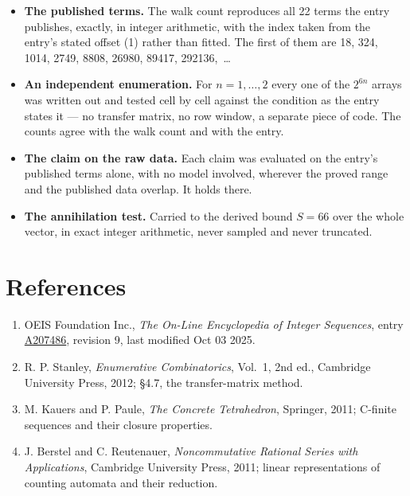 \documentclass[11pt]{article}
\theoremstyle{definition}
\begin{document}
\begin{itemize}

\item {\bfseries The published terms.} The walk count reproduces all 22 terms the entry publishes, exactly, in integer arithmetic, with the index taken from the entry's stated offset (1) rather than fitted. The first of them are 18, 324, 1014, 2749, 8808, 26980, 89417, 292136,~\dots

\item {\bfseries An independent enumeration.} For $n = 1,\dots,2$ every one of the $2^{6n}$ arrays was written out and tested cell by cell against the condition as the entry states it --- no transfer matrix, no row window, a separate piece of code. The counts agree with the walk count and with the entry.

\item {\bfseries The claim on the raw data.} Each claim was evaluated on the entry's published terms alone, with no model involved, wherever the proved range and the published data overlap. It holds there.

\item {\bfseries The annihilation test.} Carried to the derived bound $S = 66$ over the whole vector, in exact integer arithmetic, never sampled and never truncated.

\end{itemize}

\section{References}

\begin{enumerate}

\item OEIS Foundation Inc., \emph{The On-Line Encyclopedia of Integer Sequences}, entry \href{https://oeis.org/A207486}{A207486}, revision 9, last modified Oct 03 2025.

\item R. P. Stanley, \emph{Enumerative Combinatorics}, Vol.~1, 2nd ed., Cambridge University Press, 2012; \S4.7, the transfer-matrix method.

\item M. Kauers and P. Paule, \emph{The Concrete Tetrahedron}, Springer, 2011; C-finite sequences and their closure properties.

\item J. Berstel and C. Reutenauer, \emph{Noncommutative Rational Series with Applications}, Cambridge University Press, 2011; linear representations of counting automata and their reduction.

\end{enumerate}
\end{document}
